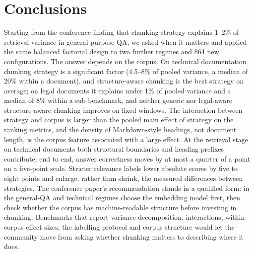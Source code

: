 \documentclass[runningheads]{llncs}
\begin{document}
\section{Conclusions}
\label{sec:conclusions}
Starting from the conference finding that chunking strategy explains 1--2\% of retrieval variance in general-purpose QA, we asked when it matters and applied the same balanced factorial design to two further regimes and 864 new configurations. The answer depends on the corpus. On technical documentation chunking strategy is a significant factor (4.5--8\% of pooled variance, a median of 20\% within a document), and structure-aware chunking is the best strategy on average; on legal documents it explains under 1\% of pooled variance and a median of 8\% within a sub-benchmark, and neither generic nor legal-aware structure-aware chunking improves on fixed windows. The interaction between strategy and corpus is larger than the pooled main effect of strategy on the ranking metrics, and the density of Markdown-style headings, not document length, is the corpus feature associated with a large effect. At the retrieval stage on technical documents both structural boundaries and heading prefixes contribute; end to end, answer correctness moves by at most a quarter of a point on a five-point scale. Stricter relevance labels lower absolute scores by five to eight points and enlarge, rather than shrink, the measured differences between strategies. The conference paper's recommendation stands in a qualified form: in the general-QA and technical regimes choose the embedding model first, then check whether the corpus has machine-readable structure before investing in chunking. Benchmarks that report variance decomposition, interactions, within-corpus effect sizes, the labelling protocol and corpus structure would let the community move from asking whether chunking matters to describing where it does.
\end{document}
